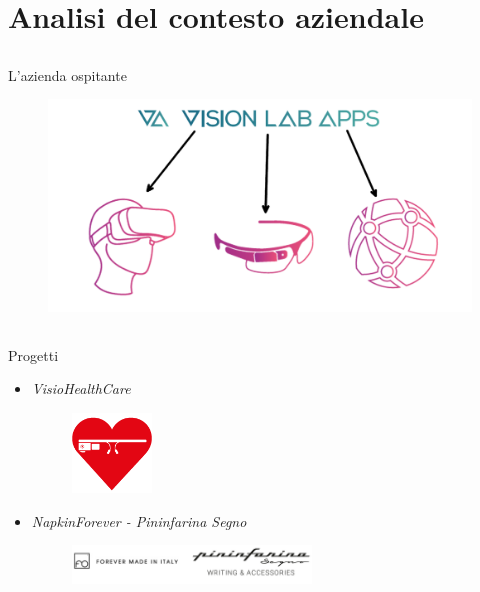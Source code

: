 \section{Analisi del contesto aziendale}
	\subsection{}
		\begin{frame}{L'azienda ospitante}
			\begin{figure}[H]
				\centering
				\includegraphics[width=1.0\textwidth]{capitolo_1/immagini/VLA.png}
			\end{figure}
		\end{frame}
	\subsection{}
		\begin{frame}{Progetti}
			\begin{itemize}
				\item \emph{VisioHealthCare}
				\begin{figure}[H]
					\includegraphics[width=0.2\textwidth]{capitolo_1/immagini/vhc.png}
				\end{figure}
				\item \emph{NapkinForever - Pininfarina Segno}
				\begin{figure}
					\includegraphics[width=0.6\textwidth]{capitolo_1/immagini/forever.png}
				\end{figure}
			\end{itemize}
		\end{frame}
